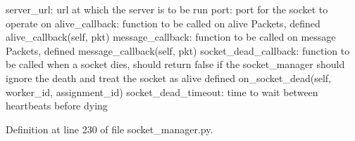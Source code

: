 \begin{DoxyVerb}server_url:           url at which the server is to be run
port:                 port for the socket to operate on
alive_callback:       function to be called on alive Packets, defined
               alive_callback(self, pkt)
message_callback:     function to be called on message Packets, defined
               message_callback(self, pkt)
socket_dead_callback: function to be called when a socket dies, should
              return false if the socket_manager should ignore
              the death and treat the socket as alive defined
               on_socket_dead(self, worker_id, assignment_id)
socket_dead_timeout:  time to wait between heartbeats before dying
\end{DoxyVerb}
 

Definition at line 230 of file socket\+\_\+manager.\+py.


